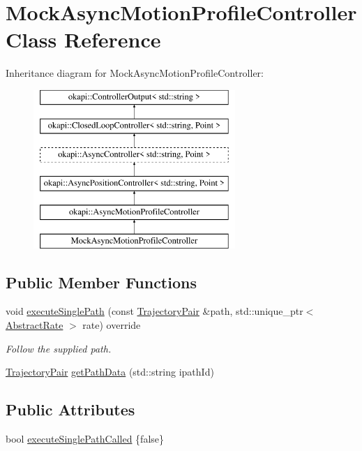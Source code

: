 \hypertarget{classMockAsyncMotionProfileController}{}\section{Mock\+Async\+Motion\+Profile\+Controller Class Reference}
\label{classMockAsyncMotionProfileController}
Inheritance diagram for Mock\+Async\+Motion\+Profile\+Controller\+:\begin{figure}[H]
\begin{center}
\leavevmode
\includegraphics[height=6.000000cm]{classMockAsyncMotionProfileController}
\end{center}
\end{figure}
\subsection*{Public Member Functions}
\begin{DoxyCompactItemize}
\item 
void \mbox{\hyperlink{classMockAsyncMotionProfileController_ac23cb420367b489e1f79e3989c77262e}{execute\+Single\+Path}} (const \mbox{\hyperlink{structokapi_1_1AsyncMotionProfileController_1_1TrajectoryPair}{Trajectory\+Pair}} \&path, std\+::unique\+\_\+ptr$<$ \mbox{\hyperlink{classokapi_1_1AbstractRate}{Abstract\+Rate}} $>$ rate) override
\begin{DoxyCompactList}\small\item\em Follow the supplied path. \end{DoxyCompactList}\item 
\mbox{\hyperlink{structokapi_1_1AsyncMotionProfileController_1_1TrajectoryPair}{Trajectory\+Pair}} \mbox{\hyperlink{classMockAsyncMotionProfileController_a1b0d76d8f5eab21d5eaced43d678939b}{get\+Path\+Data}} (std\+::string ipath\+Id)
\end{DoxyCompactItemize}
\subsection*{Public Attributes}
\begin{DoxyCompactItemize}
\item 
bool \mbox{\hyperlink{classMockAsyncMotionProfileController_ab535ac6b1a0e1d6278524827c7431ed5}{execute\+Single\+Path\+Called}} \{false\}
\end{DoxyCompactItemize}
